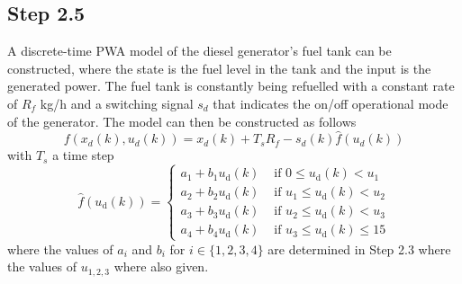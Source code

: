 \subsection*{Step 2.5}
A discrete-time PWA model of the diesel generator's fuel tank can be constructed, where the state is the fuel level in the tank and the input is the generated power. The fuel tank is constantly being refuelled with a constant rate of $R_f$ kg/h and a switching signal $s_d$ that indicates the on/off operational mode of the generator. The model can then be constructed as follows
$$
f(x_d(k),u_d(k)) = x_d(k) + T_sR_f - s_d(k)\hat{f}(u_d(k))
$$
with $T_s$ a time step
$$
\hat{f}\left(u_{\mathrm{d}}(k)\right)=\left\{\begin{array}{ll}
a_{1}+b_{1} u_{\mathrm{d}}(k) & \text { if } 0 \leq u_{\mathrm{d}}(k)<u_{1} \\
a_{2}+b_{2} u_{\mathrm{d}}(k) & \text { if } u_{1} \leq u_{\mathrm{d}}(k)<u_{2} \\
a_{3}+b_{3} u_{\mathrm{d}}(k) & \text { if } u_{2} \leq u_{\mathrm{d}}(k)<u_{3} \\
a_{4}+b_{4} u_{\mathrm{d}}(k) & \text { if } u_{3} \leq u_{\mathrm{d}}(k) \leq 15
\end{array}\right.
$$
where the values of $a_i$ and $b_i$ for $i \in \{1,2,3,4\}$ are determined in Step 2.3 where the values of $u_{1,2,3}$ where also given. 